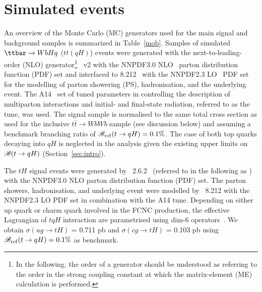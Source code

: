 \section{Simulated events}
\label{sec:simulations}

An overview of the Monte Carlo (MC) generators used for the main signal and background samples is summarized in Table~\ref{mob}.
Samples of simulated $\ttbar \to WbHq$ ($tt(qH)$) events were generated with the next-to-leading-order (NLO) generator\footnote{In the following, 
the order of a generator should be understood as referring to the order in the strong coupling constant at which the matrix-element (ME) calculation 
is performed.} {\powheg}~v2 \cite{Frixione:2007nw,Nason:2004rx,Frixione:2007vw,Alioli:2010xd}
with the NNPDF3.0 NLO~\cite{Ball:2014uwa} parton distribution function (PDF) set and interfaced to {\pythia} 8.212~\cite{Sjostrand:2007gs} with the NNPDF2.3 LO~\cite{Ball:2012cx} PDF set for the modelling of parton showering (PS), hadronisation, and the underlying event. 
The A14~\cite{ATLASUETune4} set of tuned parameters in {\pythia} controlling the description of multiparton interactions and  
initial- and final-state radiation, referred to as the tune, was used.
The signal sample is normalised to the same total cross section as used for the inclusive $t\bar{t}\to WbWb$ sample (see discussion below) and
assuming a benchmark branching ratio of $\mathscr{B}_{\mathrm{ref}}(t\to qH)=0.1\%$.
The case of both top quarks decaying into $qH$ is neglected in the analysis given the existing upper limits on $\mathscr{B}(t \to qH)$ (Section~\ref{sec:intro}).

The $tH$ signal events were generated by {\amcatnlolong}~2.6.2~\cite{Alwall:2014hca}  (referred to in the following as {\amcatnlo})
with the NNPDF3.0 NLO parton distribution function (PDF) set. The parton showers, hadronisation, and underlying event were modelled by {\pythia}~8.212 with the NNPDF2.3 LO PDF set
in combination with the A14 tune.
Depending on either up quark or charm quark involved in the FCNC production, the effective Lagrangian of $tqH$ interaction are parametrised using
dim-6 operators~\cite{fcnc_production_theory}. We obtain $\sigma(ug\to tH)$ = 0.711 pb and $\sigma(cg\to tH)$ = 0.103 pb using $\mathscr{B}_{\mathrm{ref}}(t\to qH)=0.1\%$ as benchmark.   

